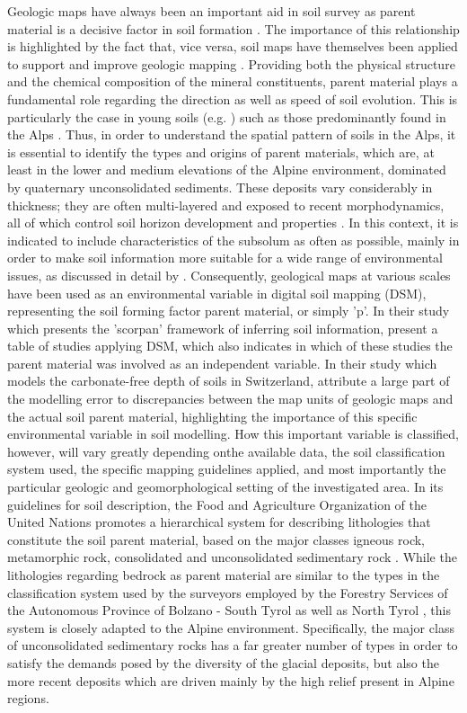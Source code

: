 \documentclass[preprint,12pt,authoryear]{elsarticle}
\begin{document}
Geologic maps have always been an important aid in soil survey as parent material is a decisive factor in soil formation \citep{Jenny1941}. The importance of this relationship is highlighted by the fact that, vice versa, soil maps have themselves been applied to support and improve geologic mapping \citep{Brevik2015}. Providing both the physical structure and the chemical composition of the mineral constituents, parent material plays a fundamental role regarding the direction as well as speed of soil evolution.  This is particularly the case in young soils (e.g. \cite{Schaetzl2000}) such as those predominantly found in the Alps \citep{Geitner2017}.  Thus, in order to understand the spatial pattern of soils in the Alps, it is essential to identify  the types and origins of parent materials, which are, at least in the lower and medium elevations of the Alpine environment, dominated by quaternary unconsolidated sediments. These deposits vary considerably in thickness; they are often multi-layered and exposed to recent morphodynamics, all of which control soil horizon development and properties \citep{Phillips2008}. In this context, it is indicated to include characteristics of the subsolum as often as possible, mainly in order to make soil information more suitable for a wide range of environmental issues, as discussed in detail by \cite{Juilleret2016}. Consequently, geological maps at various scales have been used as an environmental variable in digital soil mapping (DSM), representing the soil forming factor parent material, or simply 'p'. In their study  which presents the 'scorpan' framework of inferring soil information, \cite{McBratney2003} present a table of studies applying DSM, which also indicates in which of these studies the parent material was involved as an independent variable. In their study which models the carbonate-free depth of soils in Switzerland,  \cite{Fracek2013} attribute a large part of the modelling error to discrepancies between the map units of geologic maps and the actual soil parent material, highlighting the importance of this specific environmental variable in soil modelling. How this important variable is classified, however, will vary greatly depending onthe available data, the soil classification system used, the specific mapping guidelines applied, and most importantly the particular geologic and geomorphological setting of the investigated area. In its guidelines for soil description, the Food and Agriculture Organization of the United Nations promotes a hierarchical system for describing lithologies that constitute the soil parent material, based on the major classes igneous rock, metamorphic rock, consolidated and unconsolidated sedimentary rock \citep{FAO2006}. While the lithologies regarding bedrock as parent material are similar to the types in the classification system used by the surveyors employed by the Forestry Services of the Autonomous Province of Bolzano - South Tyrol as well as North Tyrol \citep{Englisch1998,waldtypisierungTirol}, this system is closely adapted to the Alpine environment. Specifically, the major class of unconsolidated sedimentary rocks has a far greater number of types in order to satisfy the demands posed by the diversity of the glacial deposits, but also the more recent deposits which are driven mainly by the high relief present in Alpine regions.
\end{document}
